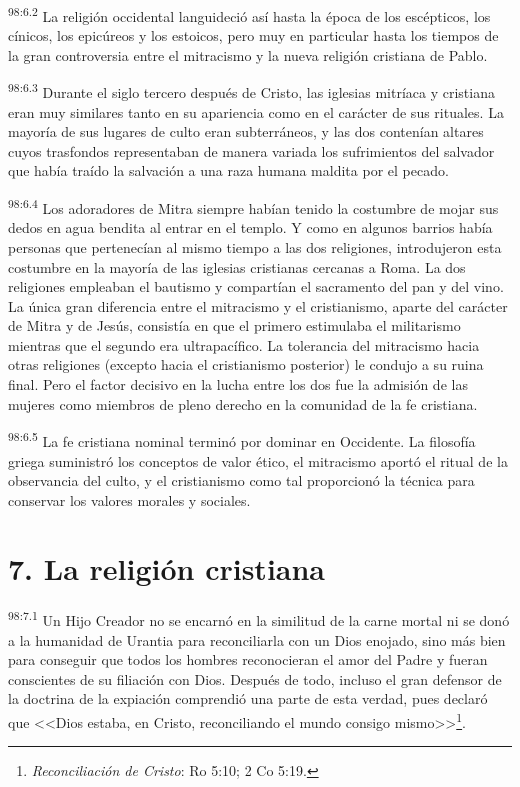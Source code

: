 \par
\textsuperscript{98:6.2} La religión occidental languideció así hasta la época de los escépticos, los cínicos, los epicúreos y los estoicos, pero muy en particular hasta los tiempos de la gran controversia entre el mitracismo y la nueva religión cristiana de Pablo.

\par
\textsuperscript{98:6.3} Durante el siglo tercero después de Cristo, las iglesias mitríaca y cristiana eran muy similares tanto en su apariencia como en el carácter de sus rituales. La mayoría de sus lugares de culto eran subterráneos, y las dos contenían altares cuyos trasfondos representaban de manera variada los sufrimientos del salvador que había traído la salvación a una raza humana maldita por el pecado.

\par
\textsuperscript{98:6.4} Los adoradores de Mitra siempre habían tenido la costumbre de mojar sus dedos en agua bendita al entrar en el templo. Y como en algunos barrios había personas que pertenecían al mismo tiempo a las dos religiones, introdujeron esta costumbre en la mayoría de las iglesias cristianas cercanas a Roma. La dos religiones empleaban el bautismo y compartían el sacramento del pan y del vino. La única gran diferencia entre el mitracismo y el cristianismo, aparte del carácter de Mitra y de Jesús, consistía en que el primero estimulaba el militarismo mientras que el segundo era ultrapacífico. La tolerancia del mitracismo hacia otras religiones (excepto hacia el cristianismo posterior) le condujo a su ruina final. Pero el factor decisivo en la lucha entre los dos fue la admisión de las mujeres como miembros de pleno derecho en la comunidad de la fe cristiana.

\par
\textsuperscript{98:6.5} La fe cristiana nominal terminó por dominar en Occidente. La filosofía griega suministró los conceptos de valor ético, el mitracismo aportó el ritual de la observancia del culto, y el cristianismo como tal proporcionó la técnica para conservar los valores morales y sociales.

\section*{7. La religión cristiana}
\par
\textsuperscript{98:7.1} Un Hijo Creador no se encarnó en la similitud de la carne mortal ni se donó a la humanidad de Urantia para reconciliarla con un Dios enojado, sino más bien para conseguir que todos los hombres reconocieran el amor del Padre y fueran conscientes de su filiación con Dios. Después de todo, incluso el gran defensor de la doctrina de la expiación comprendió una parte de esta verdad, pues declaró que <<Dios estaba, en Cristo, reconciliando el mundo consigo mismo>>\footnote{\textit{Reconciliación de Cristo}: Ro 5:10; 2 Co 5:19.}.

